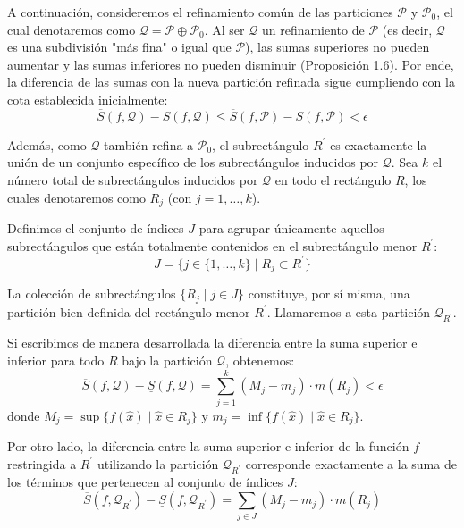 \documentclass[11pt,letterpaper]{article}
\begin{document}
A continuación, consideremos el refinamiento común de las particiones $\mathcal{P}$ y $\mathcal{P}_{0}$, el cual denotaremos como $\mathcal{Q} = \mathcal{P} \oplus \mathcal{P}_{0}$. Al ser $\mathcal{Q}$ un refinamiento de $\mathcal{P}$ (es decir, $\mathcal{Q}$ es una subdivisión "más fina" o igual que $\mathcal{P}$), las sumas superiores no pueden aumentar y las sumas inferiores no pueden disminuir (Proposición 1.6). Por ende, la diferencia de las sumas con la nueva partición refinada sigue cumpliendo con la cota establecida inicialmente:
\begin{equation*}
\overline{S}(f,\mathcal{Q}) - \underline{S}(f,\mathcal{Q}) \le \overline{S}(f,\mathcal{P}) - \underline{S}(f,\mathcal{P}) < \epsilon
\end{equation*}

Además, como $\mathcal{Q}$ también refina a $\mathcal{P}_{0}$, el subrectángulo $R^{\prime}$ es exactamente la unión de un conjunto específico de los subrectángulos inducidos por $\mathcal{Q}$. Sea $k$ el número total de subrectángulos inducidos por $\mathcal{Q}$ en todo el rectángulo $R$, los cuales denotaremos como $R_{j}$ (con $j = 1, \dots, k$). 

Definimos el conjunto de índices $J$ para agrupar únicamente aquellos subrectángulos que están totalmente contenidos en el subrectángulo menor $R^{\prime}$:
\begin{equation*}
J = \{j \in \{1, \dots, k\} \mid R_{j} \subset R^{\prime}\}
\end{equation*}

La colección de subrectángulos $\{R_{j} \mid j \in J\}$ constituye, por sí misma, una partición bien definida del rectángulo menor $R^{\prime}$. Llamaremos a esta partición $\mathcal{Q}_{R^{\prime}}$.

Si escribimos de manera desarrollada la diferencia entre la suma superior e inferior para todo $R$ bajo la partición $\mathcal{Q}$, obtenemos:
\begin{equation*}
\overline{S}(f,\mathcal{Q}) - \underline{S}(f,\mathcal{Q}) = \sum_{j=1}^{k} (M_{j} - m_{j}) \cdot m(R_{j}) < \epsilon
\end{equation*}
donde $M_{j} = \sup\{f(\hat{x}) \mid \hat{x} \in R_{j}\}$ y $m_{j} = \inf\{f(\hat{x}) \mid \hat{x} \in R_{j}\}$.

Por otro lado, la diferencia entre la suma superior e inferior de la función $f$ restringida a $R^{\prime}$ utilizando la partición $\mathcal{Q}_{R^{\prime}}$ corresponde exactamente a la suma de los términos que pertenecen al conjunto de índices $J$:
\begin{equation*}
\overline{S}(f,\mathcal{Q}_{R^{\prime}}) - \underline{S}(f,\mathcal{Q}_{R^{\prime}}) = \sum_{j \in J} (M_{j} - m_{j}) \cdot m(R_{j})
\end{equation*}
\end{document}
